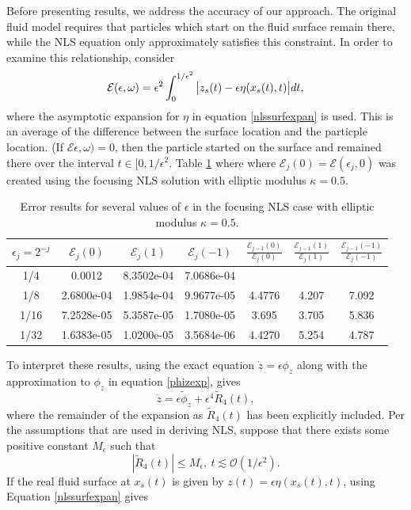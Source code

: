 \documentclass[a4paper,11pt]{article}
\begin{document}
Before presenting results, we address the accuracy of our approach.  The original fluid model requires that particles which start on the fluid surface remain there, while the NLS equation only approximately satisfies this constraint.  In order to examine this relationship, consider
\[
\mathcal{E}(\epsilon,\omega) = \epsilon^{2}\int_{0}^{1/\epsilon^{2}}\big{|}z_{s}(t) - \epsilon\eta(x_{s}(t),t) \big{|}dt, 
\]    
where the asymptotic expansion for $\eta$ in equation \eqref{nlssurfexpan} is used.  This is an average of the difference between the surface location and the particple location.  (If $\mathcal{E}\epsilon,\omega)=0$, then the particle started on the surface and remained there over the interval $t\in[0,1/\epsilon^2$.  Table \ref{errtab} where where $\mathcal{E}_{j}(0) = \mathcal{E}(\epsilon_{j},0)$ was created using the focusing NLS solution with elliptic modulus $\kappa = 0.5$.
\begin{table}[!h]
\centering
\begin{tabular}{c|cccccc}
$\epsilon_{j}=2^{-j}$ & $\mathcal{E}_{j}(0)$ & $\mathcal{E}_{j}(1)$ & $\mathcal{E}_{j}(-1)$ & $\frac{\mathcal{E}_{j-1}(0)}{\mathcal{E}_{j}(0)}$ & $\frac{\mathcal{E}_{j-1}(1)}{\mathcal{E}_{j}(1)}$ & $\frac{\mathcal{E}_{j-1}(-1)}{\mathcal{E}_{j}(-1)}$\\ 
\hline
1/4 & 0.0012 & 8.3502e-04 & 7.0686e-04 & & & \\
1/8 & 2.6800e-04 & 1.9854e-04 & 9.9677e-05 & 4.4776 & 4.207 & 7.092\\
1/16 & 7.2528e-05  & 5.3587e-05 & 1.7080e-05 & 3.695 & 3.705 & 5.836 \\
1/32 & 1.6383e-05 & 1.0200e-05 & 3.5684e-06 & 4.4270 & 5.254 & 4.787
\end{tabular}
\caption{Error results for several values of $\epsilon$ in the focusing NLS case with elliptic modulus $\kappa=0.5$.}
\label{errtab}
\end{table}
To interpret these results, using the exact equation $\dot{z}=\epsilon\phi_{z}$ along with the approximation to $\phi_{z}$ in equation \eqref{phizexp}, gives
\[
 \dot{z} = \epsilon\tilde{\phi}_{z} + \epsilon^{4}\tilde{R}_{4}(t),
\] 
where the remainder of the expansion as $\tilde{R}_{4}(t)$ has been explicitly included.  Per the assumptions that are used in deriving NLS, suppose that there exists some positive constant $M_{\epsilon}$ such that 
\[
\left|\tilde{R}_{4}(t) \right|\leq M_{\epsilon}, ~ t \lesssim \mathcal{O}(1/\epsilon^{2}). 
\]
If the real fluid surface at $x_{s}(t)$ is given by $z(t) = \epsilon \eta(x_{s}(t),t)$, using Equation \eqref{nlssurfexpan} gives
\end{document}
